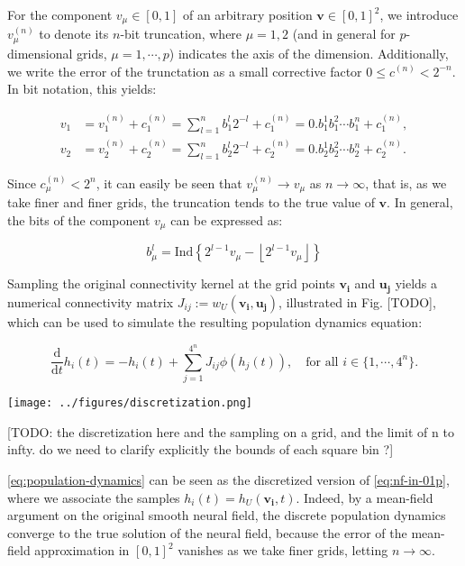 \documentclass[10pt,letterpaper]{article}
\def\d{\mathrm d}
\renewcommand{\vec}[1]{\boldsymbol{#1}}
\begin{document}
For the component $v_\mu \in [0,1]$ of an arbitrary position $\vec{v} \in [0,1]^2$, we introduce $v_\mu^{(n)}$ to denote its $n$-bit truncation, where $\mu = 1,2$ (and in general for $p$-dimensional grids, $\mu=1, \cdots, p$) indicates the axis of the dimension. Additionally, we write the error of the trunctation as a small corrective factor $0 \leq c^{(n)} < 2^{-n}$. In bit notation, this yields: 

\begin{equation} \begin{aligned} \label{eq:positions-v}
v_1 &= v_1^{(n)} + c_1^{(n)} = \sum_{l=1}^n b_1^l 2^{-l} + c_1^{(n)} = 0.b_1^1 b_1^2 \cdots b_1^n + c_1^{(n)}, \\
v_2 &= v_2^{(n)} + c_2^{(n)} = \sum_{l=1}^n b_2^l 2^{-l} + c_2^{(n)} = 0.b_2^1 b_2^2 \cdots b_2^n + c_2^{(n)}.
\end{aligned}\end{equation}

Since $c_\mu^{(n)} < 2^n$, it can easily be seen that $v_\mu^{(n)} \to v_\mu$ as $n\to\infty$, that is, as we take finer and finer grids, the truncation tends to the true value of $\vec{v}$. In general, the bits of the component $v_\mu$ can be expressed as:

\begin{equation*}
b_\mu^l = \mathrm{Ind} \left\{ 2^{l-1}v_\mu - \left\lfloor 2^{l-1}v_\mu \right\rfloor \right\}
\end{equation*}

Sampling the original connectivity kernel at the grid points $\vec{v_i}$ and $\vec{u_j}$ yields a numerical connectivity matrix $J_{ij} := w_U(\vec{v_i}, \vec{u_j})$, illustrated in Fig. [TODO], which can be used to simulate the resulting population dynamics equation:

\begin{equation} \label{eq:population-dynamics}
\frac{\d}{\d t} h_i(t) = -h_i(t) + \sum_{j=1}^{4^n} J_{ij} \phi(h_j(t)), \quad \text{for all } i \in \{1,\cdots,4^n\}.
\end{equation}

\texttt{[image: ../figures/discretization.png]}

[TODO: the discretization here and the sampling on a grid, and the limit of n to infty. do we need to clarify explicitly the bounds of each square bin ?]
\endif

\autoref{eq:population-dynamics} can be seen as the discretized version of \autoref{eq:nf-in-01p}, where we associate the samples $h_i(t) = h_U(\vec{v_i}, t)$. Indeed, by a mean-field argument on the original smooth neural field, the discrete population dynamics converge to the true solution of the neural field, because the error of the mean-field approximation in $[0,1]^2$ vanishes as we take finer grids, letting $n \to \infty$.
\end{document}

